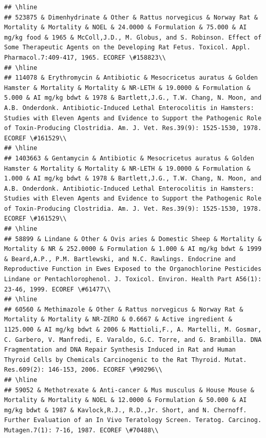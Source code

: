 \documentclass[12pt,]{article}
\begin{document}
\begin{verbatim}
## \hline
## 523875 & Dimenhydrinate & Other & Rattus norvegicus & Norway Rat & Mortality & Mortality & NOEL & 24.0000 & Formulation & 75.000 & AI mg/kg food & 1965 & McColl,J.D., M. Globus, and S. Robinson. Effect of Some Therapeutic Agents on the Developing Rat Fetus. Toxicol. Appl. Pharmacol.7:409-417, 1965. ECOREF \#158823\\
## \hline
## 114078 & Erythromycin & Antibiotic & Mesocricetus auratus & Golden Hamster & Mortality & Mortality & NR-LETH & 19.0000 & Formulation & 5.000 & AI mg/kg bdwt & 1978 & Bartlett,J.G., T.W. Chang, N. Moon, and A.B. Onderdonk. Antibiotic-Induced Lethal Enterocolitis in Hamsters: Studies with Eleven Agents and Evidence to Support the Pathogenic Role of Toxin-Producing Clostridia. Am. J. Vet. Res.39(9): 1525-1530, 1978. ECOREF \#161529\\
## \hline
## 1403663 & Gentamycin & Antibiotic & Mesocricetus auratus & Golden Hamster & Mortality & Mortality & NR-LETH & 19.0000 & Formulation & 1.000 & AI mg/kg bdwt & 1978 & Bartlett,J.G., T.W. Chang, N. Moon, and A.B. Onderdonk. Antibiotic-Induced Lethal Enterocolitis in Hamsters: Studies with Eleven Agents and Evidence to Support the Pathogenic Role of Toxin-Producing Clostridia. Am. J. Vet. Res.39(9): 1525-1530, 1978. ECOREF \#161529\\
## \hline
## 58899 & Lindane & Other & Ovis aries & Domestic Sheep & Mortality & Mortality & NR & 252.0000 & Formulation & 1.000 & AI mg/kg bdwt & 1999 & Beard,A.P., P.M. Bartlewski, and N.C. Rawlings. Endocrine and Reproductive Function in Ewes Exposed to the Organochlorine Pesticides Lindane or Pentachlorophenol. J. Toxicol. Environ. Health Part A56(1): 23-46, 1999. ECOREF \#61477\\
## \hline
## 60560 & Methimazole & Other & Rattus norvegicus & Norway Rat & Mortality & Mortality & NR-ZERO & 0.6667 & Active ingredient & 1125.000 & AI mg/kg bdwt & 2006 & Mattioli,F., A. Martelli, M. Gosmar, C. Garbero, V. Manfredi, E. Varaldo, G.C. Torre, and G. Brambilla. DNA Fragmentation and DNA Repair Synthesis Induced in Rat and Human Thyroid Cells by Chemicals Carcinogenic to the Rat Thyroid. Mutat. Res.609(2): 146-153, 2006. ECOREF \#90296\\
## \hline
## 59052 & Methotrexate & Anti-cancer & Mus musculus & House Mouse & Mortality & Mortality & NOEL & 12.0000 & Formulation & 50.000 & AI mg/kg bdwt & 1987 & Kavlock,R.J., R.D.,Jr. Short, and N. Chernoff. Further Evaluation of an In Vivo Teratology Screen. Teratog. Carcinog. Mutagen.7(1): 7-16, 1987. ECOREF \#70488\\

\end{verbatim}
\end{document}
